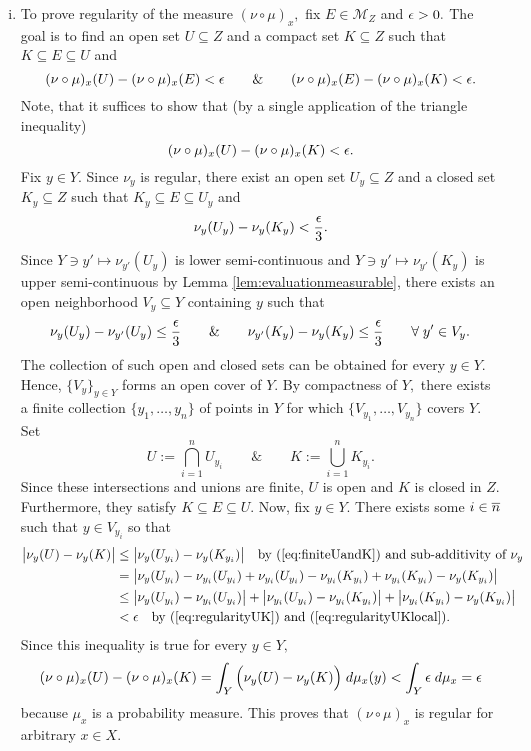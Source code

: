 \documentclass[12pt]{article}
\theoremstyle{theorem}
\theoremstyle{definition}
\numberwithin{equation}{section}
\newcommand{\be}{\begin{equation}}
\newcommand{\ee}{\end{equation}}
\newcommand{\<}{\langle}
\renewcommand{\>}{\rangle}
\newcommand{\aand}{\qquad \& \qquad}
\begin{document}
\begin{enumerate}[i.]
\item
To prove regularity of the measure $(\nu\circ\mu)_{x},$
fix $E\in\mathcal{M}_{Z}$ and $\epsilon>0.$ The goal is to find 
an open set $U\subseteq Z$ and a compact set $K\subseteq Z$ 
such that $K\subseteq E\subseteq U$ and 
\be
(\nu\circ\mu)_{x}(U)-(\nu\circ\mu)_{x}(E)<\e
\aand
(\nu\circ\mu)_{x}(E)-(\nu\circ\mu)_{x}(K)<\e.
\ee
Note, that it suffices to show that 
(by a single application of the triangle inequality)
\be
(\nu\circ\mu)_{x}(U)-(\nu\circ\mu)_{x}(K)<\e.
\ee
Fix $y\in Y.$ Since $\nu_{y}$ is regular, there exist 
an open set $U_{y}\subseteq Z$ and a closed set $K_{y}\subseteq Z$
such that $K_{y}\subseteq E\subseteq U_{y}$ and 
\be
\label{eq:regularityUK}
\nu_{y}(U_{y})-\nu_{y}(K_{y})<\frac{\e}{3}. 
\ee
Since $Y\ni y'\mapsto\nu_{y'}(U_{y})$ is lower semi-continuous 
and $Y\ni y'\mapsto\nu_{y'}(K_{y})$ is upper semi-continuous 
by Lemma \ref{lem:evaluationmeasurable}, there exists an open
neighborhood $V_{y}\subseteq Y$ containing $y$ such that 
\be
\label{eq:regularityUKlocal}
\nu_{y}(U_{y})-\nu_{y'}(U_{y})\le\frac{\e}{3}
\aand
\nu_{y'}(K_{y})-\nu_{y}(K_{y})\le\frac{\e}{3}
\qquad\forall\;y'\in V_{y}.
\ee
The collection of such open and closed sets can be obtained for every $y\in Y.$
Hence, $\{V_{y}\}_{y\in Y}$ forms an open cover of $Y.$ 
By compactness of $Y,$ there exists a finite collection
$\{y_1,\dots,y_n\}$ of points in $Y$ for which 
$\{V_{y_1}, \dots,V_{y_n}\}$ covers $Y.$ 
Set 
\be
\label{eq:finiteUandK}
U:=\bigcap_{i=1}^{n}U_{y_i}
\aand
K:=\bigcup_{i=1}^{n}K_{y_i}. 
\ee
Since these intersections and unions are finite, 
$U$ is open and $K$ is closed in $Z$.
Furthermore, they satisfy $K\subseteq E\subseteq U.$ 
Now, fix $y\in Y.$ There exists some $i\in\overline n$ such that 
$y\in V_{y_{i}}$ so that 
\be
\begin{split}
\big|\nu_{y}(U)-\nu_{y}(K)\big|&\le
\big|\nu_{y}(U_{y_{i}})-\nu_{y}(K_{y_{i}})\big|\quad\text{by (\ref{eq:finiteUandK}) and sub-additivity of $\nu_{y}$}\\
&=\big|\nu_{y}(U_{y_{i}})-\nu_{y_i}(U_{y_{i}})+\nu_{y_i}(U_{y_{i}})-\nu_{y_{i}}(K_{y_{i}})+\nu_{y_{i}}(K_{y_{i}})-\nu_{y}(K_{y_{i}})\big|\\
&\le\big|\nu_{y}(U_{y_{i}})-\nu_{y_i}(U_{y_{i}})\big|+\big|\nu_{y_i}(U_{y_{i}})-\nu_{y_{i}}(K_{y_{i}})\big|+\big|\nu_{y_{i}}(K_{y_{i}})-\nu_{y}(K_{y_{i}})\big|\\
&<\e\quad\text{by (\ref{eq:regularityUK}) and (\ref{eq:regularityUKlocal})}.
\end{split}
\ee
Since this inequality is true for every $y\in Y,$
\be
(\nu\circ\mu)_{x}(U)-(\nu\circ\mu)_{x}(K)
=\int_{Y}\Big(\nu_{y}(U)-\nu_{y}(K)\Big)\;d\mu_{x}(y)
<\int_{Y}\e\;d\mu_{x}
=\e
\ee
because $\mu_{x}$ is a probability measure. 
This proves that $(\nu\circ\mu)_{x}$ is regular for arbitrary $x\in X.$ 


\end{enumerate}
\end{document}
